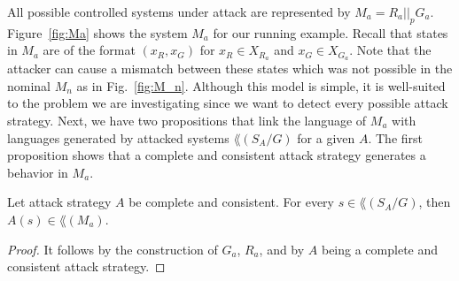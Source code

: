 All possible controlled systems under attack are represented by $M_a = R_a||_p G_a$.
Figure~\ref{fig:Ma} shows the system $M_a$ for our running example.
Recall that states in $M_a$ are of the format $(x_{R},x_{G})$ for $x_R\in X_{R_a}$ and $x_G\in X_{G_a}$.
Note that the attacker can cause a mismatch between these states which was not possible in the nominal $M_n$ as in Fig.~\ref{fig:M_n}.
Although this model is simple, it is well-suited to the problem we are investigating since we want to detect every possible attack strategy. 
Next, we have two propositions that link the language of $M_a$ with languages generated by attacked systems $\lang(S_A/G)$ for a given $A$.
The first proposition shows that a complete and consistent attack strategy generates a behavior in $M_a$.
\begin{proposition}\label{prop:Sa-Ma}
Let attack strategy $A$ be complete and consistent.
For every $s\in \lang(S_A/G)$, then $A(s) \in \lang(M_a)$.
\end{proposition}
\begin{proof}
It follows by the construction of $G_a$, $R_a$, and by $A$ being a complete and consistent attack strategy.
\end{proof}

